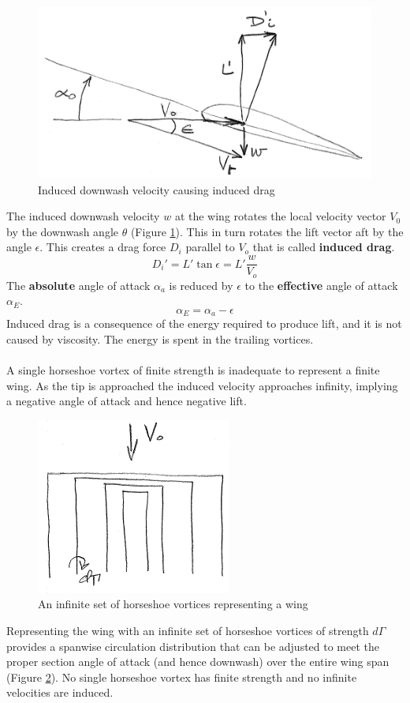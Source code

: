 \documentclass[draft=false, titlepage]{article}
\begin{document}
\begin{figure}[ht]
	\centering
	\includegraphics[width=0.6\linewidth]{Figures/p33_downwash.PNG}
	\caption{Induced downwash velocity causing induced drag}
	\label{fig:p33_downwash}
\end{figure}
The induced downwash velocity $w$ at the wing rotates the local velocity vector $V_0$ by the downwash angle $\theta$ (Figure \ref{fig:p33_downwash}). This in turn rotates the lift vector aft by the angle $\epsilon$. This creates a drag force $D_i$ parallel to $V_o$ that is called \textbf{induced drag}.
\begin{equation*}
D_i' = L' \tan\epsilon = L' \frac{w}{V_o}
\end{equation*}
The \textbf{absolute} angle of attack $\alpha_a$ is reduced by $\epsilon$ to the \textbf{effective} angle of attack $\alpha_E$.
\begin{equation*}
\alpha_E = \alpha_a-\epsilon
\end{equation*}
Induced drag is a consequence of the energy required to produce lift, and it is not caused by viscosity. The energy is spent in the trailing vortices.

\paragraph*{} A single horseshoe vortex of finite strength is inadequate to represent a finite wing. As the tip is approached the induced velocity approaches infinity, implying a negative angle of attack and hence negative lift.
\begin{figure}[ht]
	\centering
	\includegraphics[width=0.25\linewidth]{Figures/p34_horseshoeVortices.PNG}
	\caption{An infinite set of horseshoe vortices representing a wing}
	\label{fig:p34_horseshoeVortices}
\end{figure}
Representing the wing with an infinite set of horseshoe vortices of strength $d\Gamma$ provides a spanwise circulation distribution that can be adjusted to meet the proper section angle of attack (and hence downwash) over the entire wing span (Figure \ref{fig:p34_horseshoeVortices}). No single horseshoe vortex has finite strength and no infinite velocities are induced.
\end{document}
